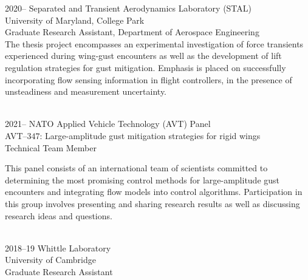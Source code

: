 \documentclass[12pt,letterpaper]{report}
\begin{document}
    \begin{tablist}

        \item[2020--]   \tab{}Separated and Transient Aerodynamics Laboratory (STAL) \\ 
        University of Maryland, College Park \\ 
        Graduate Research Assistant, Department of Aerospace Engineering  \\
        
  \vspace{1.5mm}
         The thesis project encompasses an experimental  investigation of force transients experienced during wing-gust encounters as well as the development of lift regulation strategies for gust mitigation. Emphasis is placed on successfully incorporating flow sensing information in flight controllers, in the presence of unsteadiness and measurement uncertainty. \\\
                              
                        

		\item[2021--]   \tab{}NATO Applied Vehicle Technology (AVT) Panel \\ 
		AVT--$347$: Large-amplitude gust mitigation strategies for rigid wings \\
		Technical Team Member \\
		
		\vspace{1.5mm}
		
		This panel consists of an international team of scientists committed to determining the most promising control methods for large-amplitude gust encounters and integrating flow models into control algorithms. Participation in this group involves presenting and sharing research results as well as discussing research ideas and questions. \\\
		 


        \item[2018--19] \tab{}Whittle Laboratory \\ 
        University of Cambridge \\ 
        Graduate Research Assistant \\

		
		\vspace{1.5mm}
		

\end{tablist}
\end{document}
